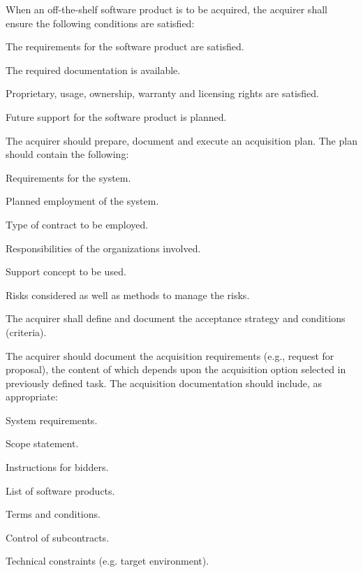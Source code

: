 \begin{adjustwidth}{2em}{0pt}
\begin{compactenum}
\begin{compactenum}
						\item When an off-the-shelf software product is to be acquired, the acquirer shall ensure the following conditions are satisfied:

						\begin{compactitem}
							\item The requirements for the software product are satisfied.
							\item The required documentation is available.
							\item Proprietary, usage, ownership, warranty and licensing rights are satisfied.
							\item Future support for the software product is planned.
						\end{compactitem}

						\item The acquirer should prepare, document and execute an acquisition plan. The plan should contain the following:

						\begin{compactitem}
							\item Requirements for the system.
							\item Planned employment of the system.
							\item Type of contract to be employed.
							\item Responsibilities of the organizations involved.
							\item Support concept to be used.
							\item Risks considered as well as methods to manage the risks.
						\end{compactitem}

						\item The acquirer shall define and document the acceptance strategy and conditions (criteria).

						\item The acquirer should document the acquisition requirements (e.g., request for proposal), the content of which depends upon the acquisition option selected in previously defined task. The acquisition documentation should include, as appropriate:

						\begin{compactitem}
							\item System requirements.
							\item Scope statement.
							\item Instructions for bidders.
							\item List of software products.
							\item Terms and conditions.
							\item Control of subcontracts.
							\item Technical constraints (e.g. target environment).
						\end{compactitem}


\end{compactenum}
\end{compactenum}
\end{adjustwidth}

